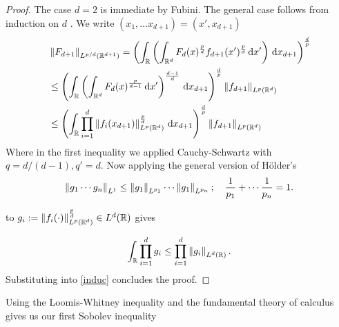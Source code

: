 \documentclass[12pt]{article}
\theoremstyle{remark}
\newcommand{\qt}[1]{\left(#1\right)}
\renewcommand{\norm}[1]{\left\lVert #1 \right\rVert}\renewcommand{\abs}[1]{\left| #1 \right|}
\renewcommand{\d}{\,\mathrm{d}}
\begin{document}
\begin{proof}
	The case $d=2$ is immediate by Fubini. The general case follows from induction on  $d$ . We write $(x_1,\ldots x_{d+1})=(x',x_{d+1})$
	\begin{align}\label{induc}
		 & \norm{F_{d+1}}_{L^{p /d}(\R^{d+1})}  =\qt{\int_{\R}\qt{\int_{\R^d} F_d(x)^{\frac{p}{d}} f_{d+1}(x')^{\frac{p}{d}} \d x'  }  \d x_{d+1} }^{\frac{d}{p} }          \\
		 & \leq \qt{\int_{\R}         \qt{\int_{\R^d} F_d(x)^{\frac{p}{d-1}} \d x'  }^{\frac{d-1}{d}}\d x_{d+1} }^{\frac{d}{p} }\norm{f_{d+1}}_{L^p(\R^d)}      \notag      \\
		 & \leq \qt{\int_{\R} \prod_{i=1}^d\left\|f_i(x_{d+1})\right\|_{L^p\left(\mathbb{R}^{d}\right)}^{\frac{p}{d}} \d x_{d+1}}^{\frac{d}{p}}\norm{f_{d+1}}_{L^p(\R^{d})}\end{align}
	Where in the first inequality we applied Cauchy-Schwartz with $q= d /(d-1), q' =d$. Now applying the general version of Hölder's\begin{align*}
		\norm{g_1\cdots g_n }_{L^1} \leq \norm{g_1}_{L^{p_1}}\cdots\norm{g_1}_{L^{p_n}}; \quad  \frac{1}{p_1}+\cdots \frac{1}{p_n}=1\notag          .
	\end{align*}


	to $g_i:= \norm{f_i(\cdot )}^{\frac{p}{d}}_{L^p(\R^{d})} \in L^{d}(\R)$ gives

	\begin{align*}
		\int_{\R}\prod_{i=1}^{d}g_i \leq \prod_{i=1}^{d} \norm{g_i}_{L^d(\R)}    .
	\end{align*}
	Substituting into \eqref{induc} concludes the proof.
\end{proof}
Using the Loomis-Whitney inequality and the fundamental theory of calculus gives us our first Sobolev inequality
\end{document}
